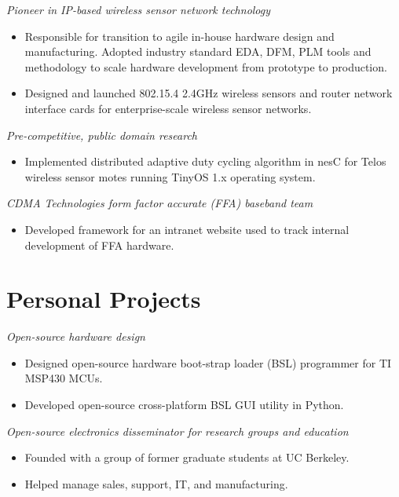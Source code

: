\documentclass[11pt,a4paper]{moderncv}
\begin{document}
{
  \textit{Pioneer in IP-based wireless sensor network technology}
  \begin{itemize}
    \item Responsible for transition to agile in-house hardware design and manufacturing.  Adopted industry standard EDA, DFM, PLM tools and methodology to scale hardware development from prototype to production.
    \item Designed and launched 802.15.4 2.4GHz  wireless sensors and router network interface cards for enterprise-scale wireless sensor networks.
  \end{itemize}
}
{
  \textit{Pre-competitive, public domain research}
  \begin{itemize}
    \item Implemented distributed adaptive duty cycling algorithm in nesC for Telos wireless sensor motes running TinyOS 1.x operating system.
  \end{itemize}
}
{
  \textit{CDMA Technologies form factor accurate (FFA) baseband team}
  \begin{itemize}
    \item Developed framework for an intranet website used to track internal development of FFA hardware.
  \end{itemize}
}
\section{Personal Projects}
{
  \textit{Open-source hardware design}
  \begin{itemize}
    \item Designed open-source hardware boot-strap loader (BSL) programmer for TI MSP430 MCUs.
    \item Developed open-source cross-platform BSL GUI utility in Python.
  \end{itemize}
}
{
  \textit{Open-source electronics disseminator for research groups and education}
  \begin{itemize}
    \item Founded with a group of former graduate students at UC Berkeley.
    \item Helped manage sales, support, IT, and manufacturing.
  \end{itemize}
}
\end{document}

